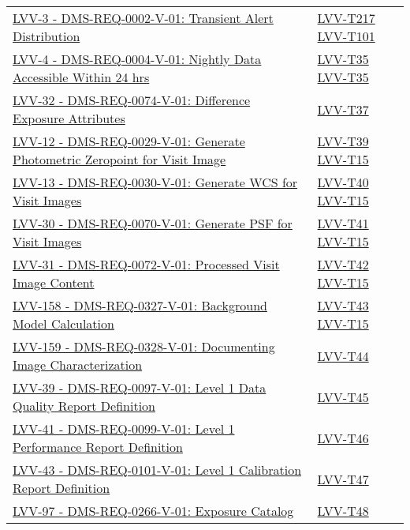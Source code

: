{\begin{longtable}[]{p{13cm}p{3cm}}
\href{https://jira.lsstcorp.org/browse/LVV-3}{LVV-3 - DMS-REQ-0002-V-01: Transient Alert Distribution}
& {
\hyperref[lvv-t217]{LVV-T217}
\hyperref[lvv-t101]{LVV-T101}
} \\
\href{https://jira.lsstcorp.org/browse/LVV-4}{LVV-4 - DMS-REQ-0004-V-01: Nightly Data Accessible Within 24 hrs}
& {
\hyperref[lvv-t35]{LVV-T35}
\hyperref[lvv-t35]{LVV-T35}
} \\
\href{https://jira.lsstcorp.org/browse/LVV-32}{LVV-32 - DMS-REQ-0074-V-01: Difference Exposure Attributes}
& {
\hyperref[lvv-t37]{LVV-T37}
} \\
\href{https://jira.lsstcorp.org/browse/LVV-12}{LVV-12 - DMS-REQ-0029-V-01: Generate Photometric Zeropoint for Visit Image}
& {
\hyperref[lvv-t39]{LVV-T39}
\hyperref[lvv-t15]{LVV-T15}
} \\
\href{https://jira.lsstcorp.org/browse/LVV-13}{LVV-13 - DMS-REQ-0030-V-01: Generate WCS for Visit Images}
& {
\hyperref[lvv-t40]{LVV-T40}
\hyperref[lvv-t15]{LVV-T15}
} \\
\href{https://jira.lsstcorp.org/browse/LVV-30}{LVV-30 - DMS-REQ-0070-V-01: Generate PSF for Visit Images}
& {
\hyperref[lvv-t41]{LVV-T41}
\hyperref[lvv-t15]{LVV-T15}
} \\
\href{https://jira.lsstcorp.org/browse/LVV-31}{LVV-31 - DMS-REQ-0072-V-01: Processed Visit Image Content}
& {
\hyperref[lvv-t42]{LVV-T42}
\hyperref[lvv-t15]{LVV-T15}
} \\
\href{https://jira.lsstcorp.org/browse/LVV-158}{LVV-158 - DMS-REQ-0327-V-01: Background Model Calculation}
& {
\hyperref[lvv-t43]{LVV-T43}
\hyperref[lvv-t15]{LVV-T15}
} \\
\href{https://jira.lsstcorp.org/browse/LVV-159}{LVV-159 - DMS-REQ-0328-V-01: Documenting Image Characterization}
& {
\hyperref[lvv-t44]{LVV-T44}
} \\
\href{https://jira.lsstcorp.org/browse/LVV-39}{LVV-39 - DMS-REQ-0097-V-01: Level 1 Data Quality Report Definition}
& {
\hyperref[lvv-t45]{LVV-T45}
} \\
\href{https://jira.lsstcorp.org/browse/LVV-41}{LVV-41 - DMS-REQ-0099-V-01: Level 1 Performance Report Definition}
& {
\hyperref[lvv-t46]{LVV-T46}
} \\
\href{https://jira.lsstcorp.org/browse/LVV-43}{LVV-43 - DMS-REQ-0101-V-01: Level 1 Calibration Report Definition}
& {
\hyperref[lvv-t47]{LVV-T47}
} \\
\href{https://jira.lsstcorp.org/browse/LVV-97}{LVV-97 - DMS-REQ-0266-V-01: Exposure Catalog}
& {
\hyperref[lvv-t48]{LVV-T48}
} \\

\end{longtable}}
